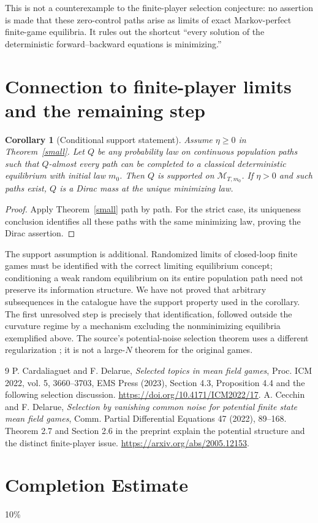 \documentclass[11pt]{article}
\newtheorem{corollary}[theorem]{Corollary}
\begin{document}
This is not a counterexample to the finite-player selection conjecture: no assertion is made that these zero-control paths arise as limits of exact Markov-perfect finite-game equilibria. It rules out the shortcut ``every solution of the deterministic forward--backward equations is minimizing.''

\section{Connection to finite-player limits and the remaining step}
\begin{corollary}[Conditional support statement]
Assume $\eta\ge0$ in Theorem~\ref{small}. Let $Q$ be any probability law on continuous population paths such that $Q$-almost every path can be completed to a classical deterministic equilibrium with initial law $m_0$. Then $Q$ is supported on $\mathcal M_{T,m_0}$. If $\eta>0$ and such paths exist, $Q$ is a Dirac mass at the unique minimizing law.
\end{corollary}
\begin{proof}
Apply Theorem~\ref{small} path by path. For the strict case, its uniqueness conclusion identifies all these paths with the same minimizing law, proving the Dirac assertion.
\end{proof}

The support assumption is additional. Randomized limits of closed-loop finite games must be identified with the correct limiting equilibrium concept; conditioning a weak random equilibrium on its entire population path need not preserve its information structure. We have not proved that arbitrary subsequences in the catalogue have the support property used in the corollary. The first unresolved step is precisely that identification, followed outside the curvature regime by a mechanism excluding the nonminimizing equilibria exemplified above. The source's potential-noise selection theorem uses a different regularization \cite{CeD}; it is not a large-$N$ theorem for the original games.

\begin{thebibliography}{9}
 P. Cardaliaguet and F. Delarue, \emph{Selected topics in mean field games}, Proc. ICM 2022, vol. 5, 3660--3703, EMS Press (2023), Section 4.3, Proposition 4.4 and the following selection discussion. \url{https://doi.org/10.4171/ICM2022/17}.
 A. Cecchin and F. Delarue, \emph{Selection by vanishing common noise for potential finite state mean field games}, Comm. Partial Differential Equations 47 (2022), 89--168. Theorem 2.7 and Section 2.6 in the preprint explain the potential structure and the distinct finite-player issue. \url{https://arxiv.org/abs/2005.12153}.
\end{thebibliography}

\section{Completion Estimate}
10\%
\end{document}
